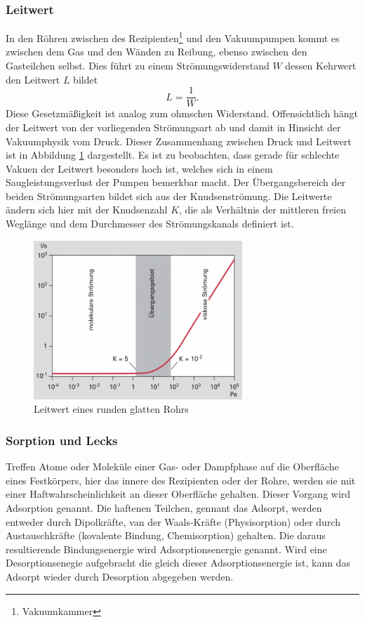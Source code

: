 \subsubsection{Leitwert}
In den Röhren zwischen des Rezipienten\footnote{Vakuumkammer} und den Vakuumpumpen kommt es zwischen dem Gas 
und den Wänden zu Reibung, ebenso zwischen den Gasteilchen selbst.
Dies führt zu einem Strömungswiderstand $W$ dessen Kehrwert den Leitwert $L$ bildet
\begin{equation}
    L = \frac{1}{W}.
\end{equation}
Diese Gesetzmäßigkeit ist analog zum ohmschen Widerstand.
Offensichtlich hängt der Leitwert von der vorliegenden Strömungsart ab
und damit in Hinsicht der Vakuumphysik vom Druck.
Dieser Zusammenhang zwischen Druck und Leitwert ist in Abbildung \ref{fig:leitwert} dargestellt.
Es ist zu beobachten, dass gerade für schlechte Vakuen der Leitwert besonders hoch ist,
welches sich in einem Saugleistungsverlust der Pumpen bemerkbar macht.
Der Übergangsbereich der beiden Strömungsarten bildet sich aus der Knudsenströmung.
Die Leitwerte ändern sich hier mit der Knudsenzahl $K$,
die als Verhältnis der mittleren freien Weglänge und dem Durchmesser des Strömungskanals definiert ist.
\begin{figure}[h]
    \centering
    \includegraphics[width=0.7\textwidth]{abb/leitwert.png}
    \caption{Leitwert eines runden glatten Rohrs \cite{Pfeifer}} 
    \label{fig:leitwert}
\end{figure} 

\subsubsection{Sorption und Lecks}
Treffen Atome oder Moleküle einer Gas- oder Dampfphase auf die Oberfläche eines Festkörpers, hier das innere des Rezipienten oder der Rohre, werden sie mit einer Haftwahrscheinlichkeit an dieser Oberfläche gehalten.
Dieser Vorgang wird Adsorption genannt. Die haftenen Teilchen, gennant das Adsorpt, werden entweder durch Dipolkräfte, van der Waals-Kräfte (Physisorption) oder durch Austauschkräfte (kovalente Bindung, Chemisorption) gehalten.
Die daraus resultierende Bindungsenergie wird Adsorptionsenergie genannt. Wird eine Desorptionsenegie aufgebracht die gleich dieser Adsorptionsenergie ist, kann das Adsorpt wieder durch Desorption abgegeben werden.

